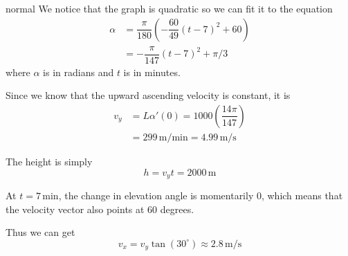 \begin{solution}{normal}
We notice that the graph is quadratic so we can fit it to the equation
\begin{align*}
    \alpha &= \dfrac{\pi}{180}\left(-\dfrac{60}{49}(t-7)^2 + 60\right) \\
    &= -\dfrac{\pi}{147}(t-7)^2 + \pi/3
\end{align*}
where $\alpha$ is in radians and $t$ is in minutes. \vspace{3mm}

Since we know that the upward ascending velocity is constant, it is
\begin{align*}
    v_y &=L\alpha '(0) = 1000\left(\dfrac{14\pi}{147}\right) \\
    &= 299 \, \mathrm{m/min} = \boxed{4.99\, \mathrm{m/s}}
\end{align*}

The height is simply $$h = v_y t = \boxed{2000 \, \mathrm{m}}$$

At $t=7 \, \mathrm{min}$, the change in elevation angle is momentarily 0, which means that the velocity vector also points at 60 degrees. \vspace{3mm}

Thus we can get
$$v_x = v_y \tan (30^{\circ}) \approx \boxed{2.8 \, \mathrm{m/s}}$$
\end{solution}
\newpage